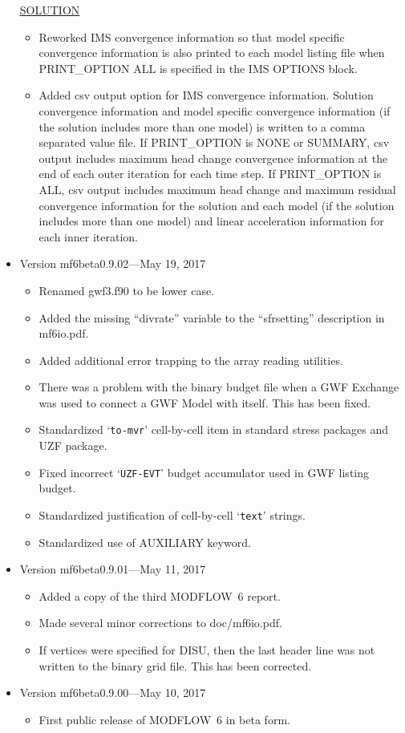 \begin{itemize}
	\underline{SOLUTION}
	\begin{itemize}
		\item Reworked IMS convergence information so that model specific convergence information is also printed to each model listing file when PRINT\_OPTION ALL is specified in the IMS OPTIONS block.
		\item Added csv output option for IMS convergence information. Solution convergence information and model specific convergence information (if the solution includes more than one model) is written to a comma separated value file. If PRINT\_OPTION is NONE or SUMMARY, csv output includes maximum head change convergence information at the end of each outer iteration for each time step. If PRINT\_OPTION is ALL, csv output includes maximum head change and maximum residual convergence information for the solution and each model (if the solution includes more than one model) and linear acceleration information for each inner iteration. 
	\end{itemize}
	
	\item
	Version mf6beta0.9.02---May 19, 2017
	\begin{itemize}
		\item Renamed gwf3.f90 to be lower case.
		\item Added the missing ``divrate'' variable to the ``sfrsetting'' description in mf6io.pdf.
		\item Added additional error trapping to the array reading utilities.
		\item There was a problem with the binary budget file when a GWF Exchange was used to connect a GWF Model with itself.  This has been fixed.
		\item Standardized `\texttt{to-mvr}' cell-by-cell item in standard stress packages and UZF package.
		\item Fixed incorrect `\texttt{UZF-EVT}' budget accumulator used in GWF listing budget. 
		\item Standardized justification of cell-by-cell `\texttt{text}' strings.
		\item Standardized use of AUXILIARY keyword.
	\end{itemize}
	
	\item
	Version mf6beta0.9.01---May 11, 2017
	\begin{itemize}
		\item Added a copy of the third MODFLOW~6 report. 
		\item Made several minor corrections to doc/mf6io.pdf.  
		\item If vertices were specified for DISU, then the last header line was not written to the binary grid file.  This has been corrected.
	\end{itemize}
	
	\item
	Version mf6beta0.9.00---May 10, 2017
	\begin{itemize}
		\item First public release of MODFLOW~6 in beta form. 
	\end{itemize}

\end{itemize}